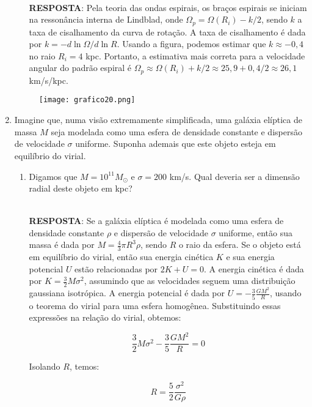 \documentclass[a4paper,12pt]{article}
\begin{document}
\begin{enumerate}
\begin{enumerate}
\noindent\hrulefill\\\textbf{RESPOSTA}: Pela teoria das ondas espirais, os braços espirais se iniciam na ressonância interna de Lindblad, onde $\Omega_p = \Omega(R_i) - k/2$, sendo $k$ a taxa de cisalhamento da curva de rotação. A taxa de cisalhamento é dada por $k = -d\ln\Omega/d\ln R$. Usando a figura, podemos estimar que $k \approx -0,4$ no raio $R_i = 4$ kpc. Portanto, a estimativa mais correta para a velocidade angular do padrão espiral é $\Omega_p \approx \Omega(R_i) + k/2 \approx 25,9 + 0,4/2 \approx 26,1$ km/s/kpc.

\noindent\hrulefill

\end{enumerate}

\begin{figure}[H]
\centering
\texttt{[image: grafico20.png]}
\end{figure}

\item Imagine que, numa visão extremamente simplificada, uma galáxia elíptica de massa $M$ seja modelada como uma esfera de densidade constante e dispersão de velocidade $\sigma$ uniforme. Suponha ademais que este objeto esteja em equilíbrio do virial.

\begin{enumerate}
\item Digamos que $M = 10^{11} M_{\odot}$ e $\sigma = 200$ km/s. Qual deveria ser a dimensão radial deste objeto em kpc?

\noindent\hrulefill\\\textbf{RESPOSTA}: Se a galáxia elíptica é modelada como uma esfera de densidade constante $\rho$ e dispersão de velocidade $\sigma$ uniforme, então sua massa é dada por $M = \frac{4}{3}\pi R^3 \rho$, sendo $R$ o raio da esfera. Se o objeto está em equilíbrio do virial, então sua energia cinética $K$ e sua energia potencial $U$ estão relacionadas por $2K + U = 0$. A energia cinética é dada por $K = \frac{3}{2}M\sigma^2$, assumindo que as velocidades seguem uma distribuição gaussiana isotrópica. A energia potencial é dada por $U = -\frac{3}{5}\frac{GM^2}{R}$, usando o teorema do virial para uma esfera homogênea. Substituindo essas expressões na relação do virial, obtemos:

$$
\frac{3}{2}M\sigma^2 - \frac{3}{5}\frac{GM^2}{R} = 0
$$

Isolando $R$, temos:

$$
R = \frac{5}{2}\frac{\sigma^2}{G\rho}
$$


\end{enumerate}
\end{enumerate}
\end{document}

